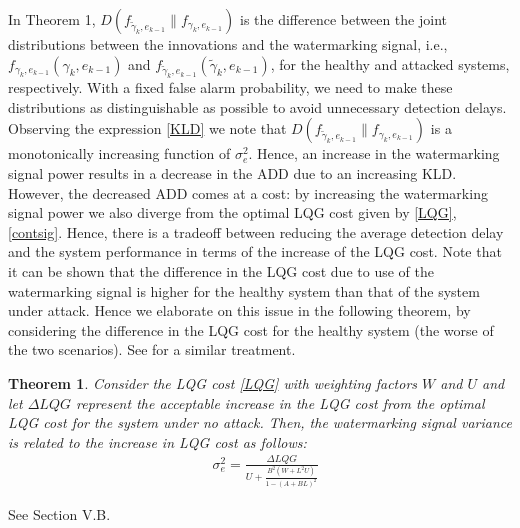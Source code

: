 \documentclass[journal,10pt]{IEEEtran}
\newtheorem{theorem}{Theorem}
\begin{document}
\vspace{.4cm}
 In Theorem 1, $D(f_{\widetilde{\gamma}_{k}, e_{k-1}}\|f_{\gamma_{k}, e_{k-1}})$ is the difference between
the joint distributions between the innovations and the watermarking signal, i.e., 
$f_{\gamma_{k}, e_{k-1}}(\gamma_{k},e_{k-1})$ and $f_{\tilde{\gamma}_{k}, e_{k-1}}(\tilde{\gamma}_{k},e_{k-1})$, for the healthy and
attacked systems, respectively. With a fixed false alarm probability, we need to
make these distributions as distinguishable as possible to avoid 
unnecessary detection delays. Observing the expression \eqref{KLD}
we note that $D(f_{\widetilde{\gamma}_{k}, e_{k-1}}\|f_{\gamma_{k}, e_{k-1}})$ is a monotonically increasing function of
$\sigma_{e}^{2}$. Hence, an increase in the watermarking signal
power results in a decrease in the ADD due to an increasing KLD. 
However, the decreased ADD comes at a cost: by increasing the watermarking signal
power we also diverge from the optimal LQG cost given by \eqref{LQG}, \eqref{contsig}.
Hence,  there is a tradeoff between reducing the average detection delay 
and the system performance in terms of the increase of the LQG
cost. Note that it can be shown that the difference in the LQG cost due to use of the watermarking signal is higher for the healthy system than that of the system under attack. Hence we elaborate on this issue in the following theorem, by considering the difference in the LQG cost for the healthy system (the worse of the two scenarios). See \cite{mo_sinopoli_15} for a similar treatment.
\begin{theorem}
Consider the LQG cost \eqref{LQG} with weighting factors $W$ and $U$ and let 
$\Delta LQG$ represent the acceptable increase in the LQG cost  from the optimal LQG
cost for the system under no attack. Then, the watermarking signal variance is related to the increase in LQG cost  as follows:
\begin{align}
& \sigma_{e}^{2}=\frac{\Delta
LQG}{U+\frac{B^{2}(W+L^{2}U)}{1-(A+BL)^{2}}}
\end{align}
\end{theorem}

\begin{IEEEproof}
See Section V.B.
\end{IEEEproof}
\end{document}
